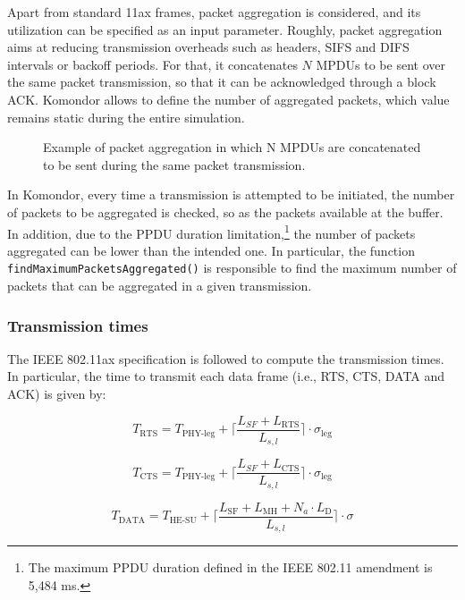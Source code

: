 \documentclass[a4paper]{article}
\begin{document}
	Apart from standard 11ax frames, packet aggregation is considered, and its utilization can be specified as an input parameter. Roughly, packet aggregation aims at reducing transmission overheads such as headers, SIFS and DIFS intervals or backoff periods. For that, it concatenates $N$ MPDUs to be sent over the same packet transmission, so that it can be acknowledged through a block ACK. Komondor allows to define the number of aggregated packets, which value remains static during the entire simulation.
	\begin{figure}[h!]
		\centering
		\caption{Example of packet aggregation in which N MPDUs are concatenated to be sent during the same packet transmission.}
		\label{fig:ampdu}
	\end{figure}

	In Komondor, every time a transmission is attempted to be initiated, the number of packets to be aggregated is checked, so as the packets available at the buffer. In addition, due to the PPDU duration limitation,\footnote{The maximum PPDU duration defined in the IEEE 802.11 amendment is 5,484 ms.} the number of packets aggregated can be lower than the intended one. In particular, the function \texttt{findMaximumPacketsAggregated()} is responsible to find the maximum number of packets that can be aggregated in a given transmission.
	
	\subsubsection{Transmission times}
	The IEEE 802.11ax specification is followed to compute the transmission times. In particular, the time to transmit each data frame (i.e., RTS, CTS, DATA and ACK) is given by:
	
	\begin{equation}
	T_\text{RTS} = T_{\text{PHY-leg}} + \lceil\frac{L_{SF} + L_\text{RTS}}{L_{s,l}}\rceil \cdot \sigma_\text{leg}
	\nonumber
	\end{equation}
	
	\begin{equation}
	T_\text{CTS} = T_{\text{PHY-leg}} + \lceil \frac{ L_{SF} + L_\text{CTS}}{L_{s,l}} \rceil \cdot \sigma_\text{leg}
	\nonumber
	\end{equation}
	
	\begin{equation}
	T_\text{DATA} = T_{\text{HE-SU}} + \lceil \frac{L_{\text{SF}} + L_{\text{MH}} + N_a \cdot L_\text{D}}{L_{s,l}} \rceil \cdot \sigma 
	\nonumber
	\end{equation}
	
\end{document}
